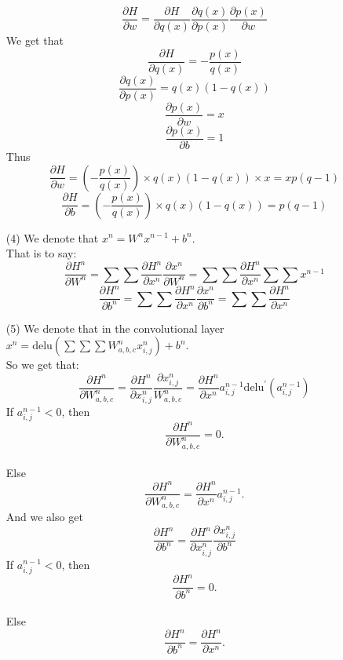 \begin{solution}
\begin{enumerate}
            \[\frac{\partial H}{\partial w}=\frac{\partial H}{\partial q(x)}\frac{\partial q(x)}{\partial p(x)}\frac{\partial p(x)}{\partial w}\]
            We get that
            \[\frac{\partial H}{\partial q(x)}=-\frac{p(x)}{q(x)}\]
            \[\frac{\partial q(x)}{\partial p(x)}=q(x)(1-q(x))\]
            \[\frac{\partial p(x)}{\partial w}=x\]
            \[\frac{\partial p(x)}{\partial b}=1\]
            Thus
            \[\frac{\partial H}{\partial w}=(-\frac{p(x)}{q(x)})\times q(x)(1-q(x))\times x=xp(q-1)\]
            \[\frac{\partial H}{\partial b}=(-\frac{p(x)}{q(x)})\times q(x)(1-q(x))=p(q-1)\]
        \item[(4)] We denote that $x^n=W^{n}x^{n-1}+b^n$.\\
            That is to say:
            \[\frac{\partial H^{n}}{\partial W^{n}}=\sum\sum\frac{\partial H^{n}}{\partial x^{n}}\frac{\partial x^{n}}{\partial W^{n}}=\sum\sum\frac{\partial H^{n}}{\partial x^{n}}\sum\sum x^{n-1}\]
            \[\frac{\partial H^{n}}{\partial b^{n}}=\sum\sum\frac{\partial H^{n}}{\partial x^{n}}\frac{\partial x^{n}}{\partial b^{n}}=\sum\sum\frac{\partial H^{n}}{\partial x^{n}}\]
        \item[(5)] We denote that in the convolutional layer $x^{n}=\mathrm{delu}(\sum\sum\sum W^{n}_{a,b,c}x^{n}_{i,j})+b^{n}$.\\
            So we get that:
            \[\frac{\partial H^{n}}{\partial W^{n}_{a,b,c}}=\frac{\partial H^{n}}{\partial x^{n}_{i,j}}\frac{\partial x^{n}_{i,j}}{W^{n}_{a,b,c}}=\frac{\partial H^{n}}{\partial x^{n}}a^{n-1}_{i,j}\mathrm{delu}^{\prime}(a^{n-1}_{i,j})\]
            If $a^{n-1}_{i,j}<0$, then
            \[\frac{\partial H^{n}}{\partial W^{n}_{a,b,c}}=0.\]\\
            Else
            \[\frac{\partial H^{n}}{\partial W^{n}_{a,b,c}}=\frac{\partial H^{n}}{\partial x^{n}}a^{n-1}_{i,j}.\]
            And we also get
            \[\frac{\partial H^{n}}{\partial b^{n}}=\frac{\partial H^{n}}{\partial x^{n}_{i,j}}\frac{\partial x^{n}_{i,j}}{\partial b^{n}}\]
            If $a^{n-1}_{i,j}<0$, then
            \[\frac{\partial H^{n}}{\partial b^{n}}=0.\]\\
            Else
            \[\frac{\partial H^{n}}{\partial b^{n}}=\frac{\partial H^{n}}{\partial x^{n}}.\]

    \end{enumerate}
\end{solution}
